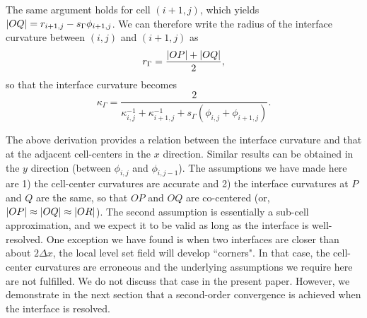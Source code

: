 The same argument holds for cell $(i+1,j)$, which yields $\lvert OQ\rvert = r_{i+1,j} - s_\Gamma \phi_{i+1,j}$. We can therefore write the radius of the interface curvature between $(i,j)$ and $(i+1,j)$ as
\begin{equation}
    r_\Gamma = \frac{\lvert OP\rvert+\lvert OQ\rvert}{2},
  \label{2d icurv 0}
\end{equation}
so that the interface curvature becomes
\begin{equation}
    \kappa_{\Gamma} = \displaystyle \frac{2}{ \kappa_{i,j}^{-1} + \kappa_{i+1,j}^{-1} +s_\Gamma (\phi_{i,j}+\phi_{i+1,j}) }.
  \label{2d icurv}
\end{equation}

The above derivation provides a relation between the interface curvature and that at the adjacent cell-centers in the $x$ direction. Similar results can be obtained in the $y$ direction (\eg between $\phi_{i,j}$ and $\phi_{i,j-1}$). The assumptions we have made here are 1) the cell-center curvatures are accurate and 2) the interface curvatures at $P$ and $Q$ are the same, so that $OP$ and $OQ$ are co-centered (or, $\lvert OP\rvert \approx \lvert OQ\rvert \approx \lvert OR\rvert$). The second assumption is essentially a sub-cell approximation, and we expect it to be valid as long as the interface is well-resolved. One exception we have found is when two interfaces are closer than about $2\Delta x$, the local level set field will develop ``corners". In that case, the cell-center curvatures are erroneous and the underlying assumptions we require here are not fulfilled. We do not discuss that case in the present paper. However, we demonstrate in the next section that a second-order convergence is achieved when the interface is resolved.


